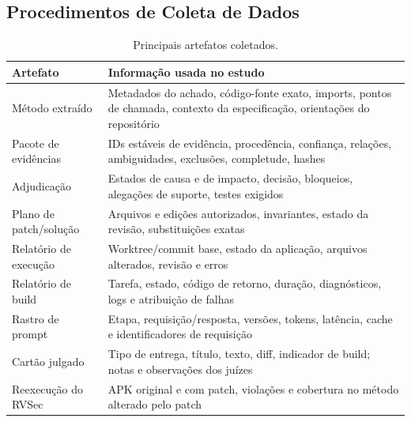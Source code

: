 \documentclass[conference]{IEEEtran}
\begin{document}
\subsection{Procedimentos de Coleta de Dados}
\label{subsec:collection}

\begin{table}[H]
\centering
\caption{Principais artefatos coletados.}
\label{tab:artifacts}
\footnotesize
\begin{tabular}{p{2.3cm}p{5.0cm}}
\toprule
Artefato & Informação usada no estudo \\
\midrule
Método extraído & Metadados do achado, código-fonte exato, imports, pontos de chamada,
contexto da especificação, orientações do repositório \\
Pacote de evidências & IDs estáveis de evidência, procedência, confiança, relações,
ambiguidades, exclusões, completude, hashes \\
Adjudicação & Estados de causa e de impacto, decisão, bloqueios, alegações de suporte,
testes exigidos \\
Plano de patch/solução & Arquivos e edições autorizados, invariantes, estado da revisão,
substituições exatas \\
Relatório de execução & Worktree/commit base, estado da aplicação, arquivos alterados,
revisão e erros \\
Relatório de build & Tarefa, estado, código de retorno, duração, diagnósticos, logs e
atribuição de falhas \\
Rastro de prompt & Etapa, requisição/resposta, versões, tokens, latência, cache e
identificadores de requisição \\
Cartão julgado & Tipo de entrega, título, texto, diff, indicador de build; notas e observações dos juízes \\
Reexecução do RVSec & APK original e com patch, violações e cobertura no método alterado pelo patch \\
\bottomrule
\end{tabular}
\end{table}
\end{document}
